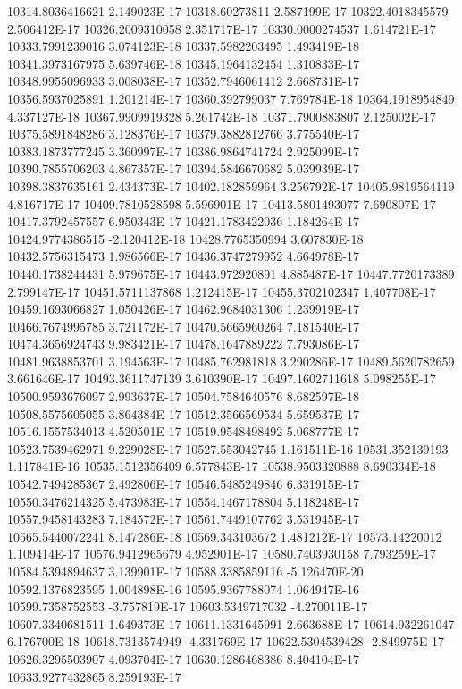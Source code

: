 10314.8036416621  2.149023E-17
10318.60273811  2.587199E-17
10322.4018345579  2.506412E-17
10326.2009310058  2.351717E-17
10330.0000274537  1.614721E-17
10333.7991239016  3.074123E-18
10337.5982203495  1.493419E-18
10341.3973167975  5.639746E-18
10345.1964132454  1.310833E-17
10348.9955096933  3.008038E-17
10352.7946061412  2.668731E-17
10356.5937025891  1.201214E-17
10360.392799037  7.769784E-18
10364.1918954849  4.337127E-18
10367.9909919328  5.261742E-18
10371.7900883807  2.125002E-17
10375.5891848286  3.128376E-17
10379.3882812766  3.775540E-17
10383.1873777245  3.360997E-17
10386.9864741724  2.925099E-17
10390.7855706203  4.867357E-17
10394.5846670682  5.039939E-17
10398.3837635161  2.434373E-17
10402.182859964  3.256792E-17
10405.9819564119  4.816717E-17
10409.7810528598  5.596901E-17
10413.5801493077  7.690807E-17
10417.3792457557  6.950343E-17
10421.1783422036  1.184264E-17
10424.9774386515  -2.120412E-18
10428.7765350994  3.607830E-18
10432.5756315473  1.986566E-17
10436.3747279952  4.664978E-17
10440.1738244431  5.979675E-17
10443.972920891  4.885487E-17
10447.7720173389  2.799147E-17
10451.5711137868  1.212415E-17
10455.3702102347  1.407708E-17
10459.1693066827  1.050426E-17
10462.9684031306  1.239919E-17
10466.7674995785  3.721172E-17
10470.5665960264  7.181540E-17
10474.3656924743  9.983421E-17
10478.1647889222  7.793086E-17
10481.9638853701  3.194563E-17
10485.762981818  3.290286E-17
10489.5620782659  3.661646E-17
10493.3611747139  3.610390E-17
10497.1602711618  5.098255E-17
10500.9593676097  2.993637E-17
10504.7584640576  8.682597E-18
10508.5575605055  3.864384E-17
10512.3566569534  5.659537E-17
10516.1557534013  4.520501E-17
10519.9548498492  5.068777E-17
10523.7539462971  9.229028E-17
10527.553042745  1.161511E-16
10531.352139193  1.117841E-16
10535.1512356409  6.577843E-17
10538.9503320888  8.690334E-18
10542.7494285367  2.492806E-17
10546.5485249846  6.331915E-17
10550.3476214325  5.473983E-17
10554.1467178804  5.118248E-17
10557.9458143283  7.184572E-17
10561.7449107762  3.531945E-17
10565.5440072241  8.147286E-18
10569.343103672  1.481212E-17
10573.14220012  1.109414E-17
10576.9412965679  4.952901E-17
10580.7403930158  7.793259E-17
10584.5394894637  3.139901E-17
10588.3385859116  -5.126470E-20
10592.1376823595  1.004898E-16
10595.9367788074  1.064947E-16
10599.7358752553  -3.757819E-17
10603.5349717032  -4.270011E-17
10607.3340681511  1.649373E-17
10611.1331645991  2.663688E-17
10614.932261047  6.176700E-18
10618.7313574949  -4.331769E-17
10622.5304539428  -2.849975E-17
10626.3295503907  4.093704E-17
10630.1286468386  8.404104E-17
10633.9277432865  8.259193E-17
